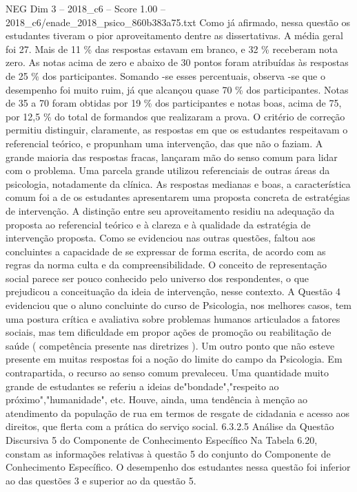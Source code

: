 \begin{textsample}{NEG Dim 3 – 2018\_c6 – Score 1.00 – 2018\_c6/enade\_2018\_psico\_860b383a75.txt}
Como já afirmado, nessa questão os estudantes tiveram o pior aproveitamento dentre as dissertativas.
A média geral foi 27.
Mais de 11 \% das respostas estavam em branco, e 32 \% receberam nota zero.
As notas acima de zero e abaixo de 30 pontos foram atribuídas às respostas de 25 \% dos participantes.
Somando -se esses percentuais, observa -se que o desempenho foi muito ruim, já que alcançou quase 70 \% dos participantes.
Notas de 35 a 70 foram obtidas por 19 \% dos participantes e notas boas, acima de 75, por 12,5 \% do total de formandos que realizaram a prova.
O critério de correção permitiu distinguir, claramente, as respostas em que os estudantes respeitavam o referencial teórico, e propunham uma intervenção, das que não o faziam.
A grande maioria das respostas fracas, lançaram mão do senso comum para lidar com o problema.
Uma parcela grande utilizou referenciais de outras áreas da psicologia, notadamente da clínica.
As respostas medianas e boas, a característica comum foi a de os estudantes apresentarem uma proposta concreta de estratégias de intervenção.
A distinção entre seu aproveitamento residiu na adequação da proposta ao referencial teórico e à clareza e à qualidade da estratégia de intervenção proposta.
Como se evidenciou nas outras questões, faltou aos concluintes a capacidade de se expressar de forma escrita, de acordo com as regras da norma culta e da compreensibilidade.
O conceito de representação social parece ser pouco conhecido pelo universo dos respondentes, o que prejudicou a conceituação da ideia de intervenção, nesse contexto.
A Questão 4 evidenciou que o aluno concluinte do curso de Psicologia, nos melhores casos, tem uma postura crítica e avaliativa sobre problemas humanos articulados a fatores sociais, mas tem dificuldade em propor ações de promoção ou reabilitação de saúde ( competência presente nas diretrizes ).
Um outro ponto que não esteve presente em muitas respostas foi a noção do limite do campo da Psicologia.
Em contrapartida, o recurso ao senso comum prevaleceu.
Uma quantidade muito grande de estudantes se referiu a ideias de"bondade","respeito ao próximo","humanidade", etc.
Houve, ainda, uma tendência à menção ao atendimento da população de rua em termos de resgate de cidadania e acesso aos direitos, que flerta com a prática do serviço social. 6.3.2.5 Análise da Questão Discursiva 5 do Componente de Conhecimento Específico Na Tabela 6.20, constam as informações relativas à questão 5 do conjunto do Componente de Conhecimento Específico.
O desempenho dos estudantes nessa questão foi inferior ao das questões 3 e superior ao da questão 5.

\end{textsample}
